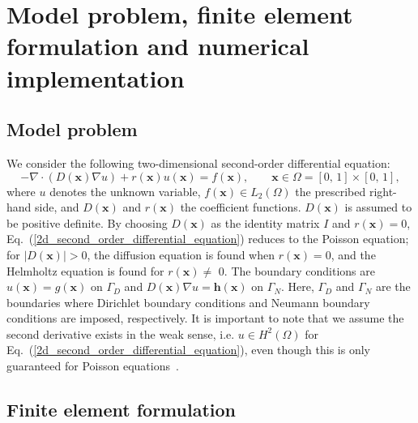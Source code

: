 \documentclass[review,3p]{elsarticle}
\begin{document}
\section{Model problem, finite element formulation and numerical implementation}	\label{section_model_problem_FEM_formulation_numerical_implementation}

\subsection{Model problem}				\label{section_model_problem}

We consider the following two-dimensional second-order differential equation:
\begin{equation}
 -\nabla \cdot \left(D(\mathbf{x}) \nabla u \right) + r(\mathbf{x})u(\mathbf{x}) = f(\mathbf{x}),\qquad \mathbf{x} \in \Omega = [0,\,1] \times [0,\,1],	\label{2d_second_order_differential_equation}
\end{equation}
where $u$ denotes the unknown variable, $f(\mathbf{x}) \in L_2 (\Omega)$ the prescribed right-hand side, and $D(\mathbf{x})$ and $r(\mathbf{x})$ the coefficient functions. $D(\mathbf{x})$ is assumed to be positive definite.
By choosing $D(\mathbf{x})$ as the identity matrix $I$ and $r(\mathbf{x})=0$, Eq.~(\ref{2d_second_order_differential_equation}) reduces to the Poisson equation; for $|D(\mathbf{x})|>$0, the diffusion equation is found when $r(\mathbf{x})=0$, and the Helmholtz equation is found for $r(\mathbf{x}) \neq $ 0. 
The boundary conditions are $u(\mathbf{x})=g(\mathbf{x})$ on $\Gamma_D$ and $D(\mathbf{x})\nabla u=\mathbf{h}(\mathbf{x})$ on $\Gamma_N$. Here, $\Gamma_D$ and $\Gamma_N$ are the boundaries where Dirichlet boundary conditions and Neumann boundary conditions are imposed, respectively. It is important to note that we assume the second derivative exists in the weak sense, i.e. $u \in H^2(\Omega)$ for Eq.~(\ref{2d_second_order_differential_equation}), even though this is only guaranteed for Poisson equations~\cite[p.~9]{boffi2013mixed}.

\subsection{Finite element formulation} 	\label{FE formulation}
\end{document}
